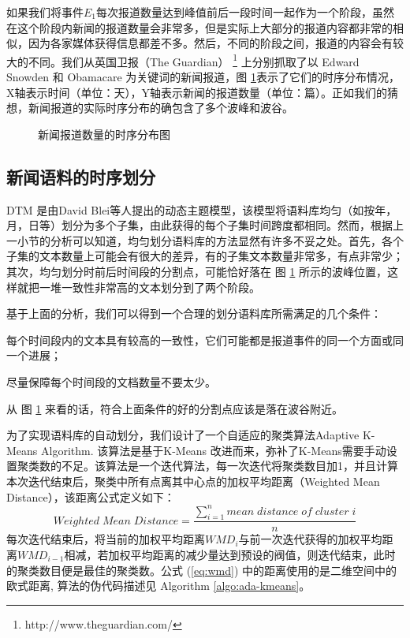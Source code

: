 如果我们将事件$E_1$每次报道数量达到峰值前后一段时间一起作为一个阶段，虽然在这个阶段内新闻的报道数量会非常多，但是实际上大部分的报道内容都非常的相似，因为各家媒体获得信息都差不多。然后，不同的阶段之间，报道的内容会有较大的不同。我们从英国卫报（The Guardian） \footnote{http://www.theguardian.com/} 上分别抓取了以 Edward Snowden 和 Obamacare 为关键词的新闻报道，图 \ref{fig:temporal-dist}表示了它们的时序分布情况，X轴表示时间（单位：天），Y轴表示新闻的报道数量（单位：篇）。正如我们的猜想，新闻报道的实际时序分布的确包含了多个波峰和波谷。
\begin{figure}[htb]
	\centering
	\caption{新闻报道数量的时序分布图}
	\label{fig:temporal-dist}
\end{figure}

\subsection{新闻语料的时序划分}
\label{sec:ada-kmeans}
DTM \cite{Blei:2006}是由David Blei等人提出的动态主题模型，该模型将语料库均匀（如按年，月，日等）划分为多个子集，由此获得的每个子集时间跨度都相同。然而，根据上一小节的分析可以知道，均匀划分语料库的方法显然有许多不妥之处。首先，各个子集的文本数量上可能会有很大的差异，有的子集文本数量非常多，有点非常少；其次，均匀划分时前后时间段的分割点，可能恰好落在 图 \ref{fig:temporal-dist} 所示的波峰位置，这样就把一堆一致性非常高的文本划分到了两个阶段。

基于上面的分析，我们可以得到一个合理的划分语料库所需满足的几个条件：
\begin{inparaenum}[\itshape 1 \upshape)]
\item 每个时间段内的文本具有较高的一致性，它们可能都是报道事件的同一个方面或同一个进展；
\item 尽量保障每个时间段的文档数量不要太少。
\end{inparaenum}
从 图 \ref{fig:temporal-dist} 来看的话，符合上面条件的好的分割点应该是落在波谷附近。

为了实现语料库的自动划分，我们设计了一个自适应的聚类算法Adaptive K-Means Algorithm. 该算法是基于K-Means \cite{kanungo2002efficient} 改进而来，弥补了K-Means需要手动设置聚类数的不足。该算法是一个迭代算法，每一次迭代将聚类数目加1，并且计算本次迭代结束后，聚类中所有点离其中心点的加权平均距离（Weighted Mean Distance），该距离公式定义如下：
\begin{equation}
\label{eq:wmd}
Weighted\;Mean\;Distance=\frac{\sum_{i=1}^{n}{mean\;distance\;of\;cluster\;i}}{n}
\end{equation}
每次迭代结束后，将当前的加权平均距离$WMD_i$与前一次迭代获得的加权平均距离$WMD_{i-1}$相减，若加权平均距离的减少量达到预设的阀值，则迭代结束，此时的聚类数目便是最佳的聚类数。公式 (\ref{eq:wmd}) 中的距离使用的是二维空间中的欧式距离, 算法的伪代码描述见 Algorithm \ref{algo:ada-kmeans}。

